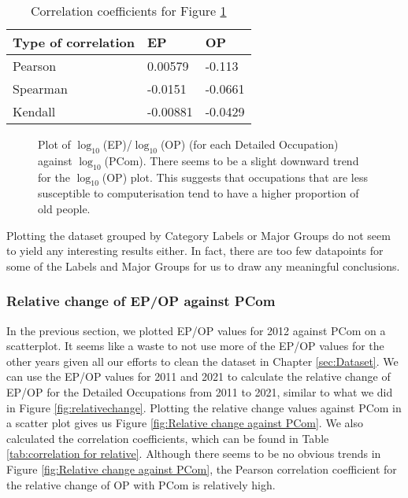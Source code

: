 \documentclass[11pt]{article}
\begin{document}
\begin{table}[]
	\centering
	\begin{tabular}{l|ll|ll}
	\textbf{Type of correlation} & \multicolumn{2}{l|}{\textbf{EP}} & \multicolumn{2}{l}{\textbf{OP}} \\ \hline
	Pearson                      & \multicolumn{2}{l|}{0.00579}     & \multicolumn{2}{l}{-0.113}      \\ \hline
	Spearman                     & \multicolumn{2}{l|}{-0.0151}      & \multicolumn{2}{l}{-0.0661}    \\ \hline
	Kendall                      & \multicolumn{2}{l|}{-0.00881}      & \multicolumn{2}{l}{-0.0429}   
	\end{tabular}
	\caption{Correlation coefficients for Figure \ref{fig:logEP/OP against PCom}}
	\label{tab:logcorrelation}
	\end{table}


\begin{figure}[!htb]
	\centering
	\hfill
	\hfill
	\caption{Plot of $\log_{10}$(EP)/$\log_{10}$(OP) (for each Detailed Occupation) against $\log_{10}$(PCom). There seems to be a slight downward trend for the $\log_{10}$(OP) plot. This suggests that occupations that are less susceptible to computerisation tend to have a higher proportion of old people.}
	\label{fig:logEP/OP against PCom}
\end{figure}


Plotting the dataset grouped by Category Labels or Major Groups do not seem to yield any interesting results either. In fact, there are too few datapoints for some of the Labels and Major Groups for us to draw any meaningful conclusions.

\subsubsection*{Relative change of EP/OP against PCom}
In the previous section, we plotted EP/OP values for 2012 against PCom on a scatterplot. It seems like a waste to not use more of the EP/OP values for the other years given all our efforts to clean the dataset in Chapter \ref{sec:Dataset}. We can use the EP/OP values for 2011 and 2021 to calculate the relative change of EP/OP for the Detailed Occupations from 2011 to 2021, similar to what we did in Figure \ref{fig:relativechange}. Plotting the relative change values against PCom in a scatter plot gives us Figure \ref{fig:Relative change against PCom}. We also calculated the correlation coefficients, which can be found in Table \ref{tab:correlation for relative}. Although there seems to be no obvious trends in Figure \ref{fig:Relative change against PCom}, the Pearson correlation coefficient for the relative change of OP with PCom is relatively high.
\end{document}
